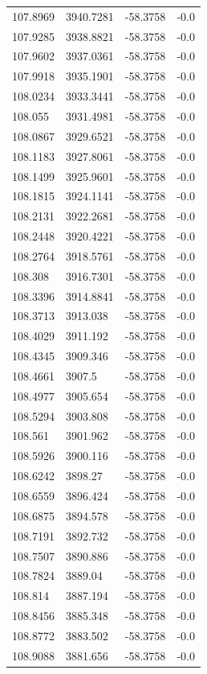 \begin{table}[H]
\begin{tabular}{llll}
107.8969 & 3940.7281 & -58.3758 & -0.0 \\
107.9285 & 3938.8821 & -58.3758 & -0.0 \\
107.9602 & 3937.0361 & -58.3758 & -0.0 \\
107.9918 & 3935.1901 & -58.3758 & -0.0 \\
108.0234 & 3933.3441 & -58.3758 & -0.0 \\
108.055 & 3931.4981 & -58.3758 & -0.0 \\
108.0867 & 3929.6521 & -58.3758 & -0.0 \\
108.1183 & 3927.8061 & -58.3758 & -0.0 \\
108.1499 & 3925.9601 & -58.3758 & -0.0 \\
108.1815 & 3924.1141 & -58.3758 & -0.0 \\
108.2131 & 3922.2681 & -58.3758 & -0.0 \\
108.2448 & 3920.4221 & -58.3758 & -0.0 \\
108.2764 & 3918.5761 & -58.3758 & -0.0 \\
108.308 & 3916.7301 & -58.3758 & -0.0 \\
108.3396 & 3914.8841 & -58.3758 & -0.0 \\
108.3713 & 3913.038 & -58.3758 & -0.0 \\
108.4029 & 3911.192 & -58.3758 & -0.0 \\
108.4345 & 3909.346 & -58.3758 & -0.0 \\
108.4661 & 3907.5 & -58.3758 & -0.0 \\
108.4977 & 3905.654 & -58.3758 & -0.0 \\
108.5294 & 3903.808 & -58.3758 & -0.0 \\
108.561 & 3901.962 & -58.3758 & -0.0 \\
108.5926 & 3900.116 & -58.3758 & -0.0 \\
108.6242 & 3898.27 & -58.3758 & -0.0 \\
108.6559 & 3896.424 & -58.3758 & -0.0 \\
108.6875 & 3894.578 & -58.3758 & -0.0 \\
108.7191 & 3892.732 & -58.3758 & -0.0 \\
108.7507 & 3890.886 & -58.3758 & -0.0 \\
108.7824 & 3889.04 & -58.3758 & -0.0 \\
108.814 & 3887.194 & -58.3758 & -0.0 \\
108.8456 & 3885.348 & -58.3758 & -0.0 \\
108.8772 & 3883.502 & -58.3758 & -0.0 \\
108.9088 & 3881.656 & -58.3758 & -0.0 \\

\end{tabular}
\end{table}
